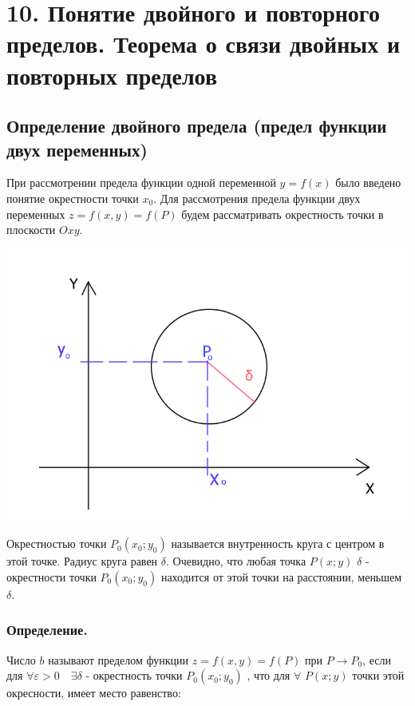 \section{10. Понятие двойного и повторного пределов. Теорема о связи
двойных и повторных пределов}

\subsection{Определение двойного предела (предел функции двух
переменных)}

При рассмотрении предела функции одной переменной \(y=f(x)\) было
введено понятие окрестности точки \(x_{0}\). Для рассмотрения предела
функции двух переменных \(z=f\left(x, y\right)=f(P)\) будем
рассматривать окрестность точки в плоскости \(Oxy\).

\includegraphics{10img.png}

Окрестностью точки \(P_{0}\left(x_{0}; y_{0}\right)\) называется
внутренность круга с центром в этой точке. Радиус круга равен
\(\delta\). Очевидно, что любая точка \(P\left(x; y\right)\) \(\delta\)
- окрестности точки \(P_{0}\left(x_{0}; y_{0}\right)\) находится от этой
точки на расстоянии, меньшем \(\delta\).

\subsubsection{Определение.}

Число \(b\) называют пределом функции \(z=f(x, y)=f(P)\) при
\(P \rightarrow P_{0}\), если для
\(\forall \varepsilon>0 \quad \exists \delta\) - окрестность точки
\(P_{0}\left(x_{0}; y_{0}\right)\) , что для \(\forall\)
\(P\left(x; y\right)\) точки этой окресности, имеет место равенство:

